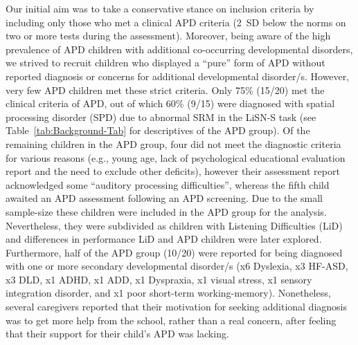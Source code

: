 \documentclass[a4paper, twoside]{templates/ociamthesis}
\begin{document}
Our initial aim was to take a conservative stance on inclusion criteria by including only those who met a clinical APD criteria (2~SD below the norms on two or more tests during the assessment). Moreover, being aware of the high prevalence of APD children with additional co-occurring developmental disorders, we strived to recruit children who displayed a ``pure'' form of APD without reported diagnosis or concerns for additional developmental disorder/s. However, very few APD children met these strict criteria. Only 75\% (15/20) met the clinical criteria of APD, out of which 60\% (9/15) were diagnosed with spatial processing disorder (SPD) due to abnormal SRM in the LiSN-S task (see Table~\ref{tab:Background-Tab} for descriptives of the APD group). Of the remaining children in the APD group, four did not meet the diagnostic criteria for various reasons (e.g., young age, lack of psychological educational evaluation report and the need to exclude other deficits), however their assessment report acknowledged some ``auditory processing difficulties'', whereas the fifth child awaited an APD assessment following an APD screening. Due to the small sample-size these children were included in the APD group for the analysis. Nevertheless, they were subdivided as children with Listening Difficulties (LiD) and differences in performance LiD and APD children were later explored. Furthermore, half of the APD group (10/20) were reported for being diagnosed with one or more secondary developmental disorder/s (x6 Dyslexia, x3 HF-ASD, x3 DLD, x1 ADHD, x1 ADD, x1 Dyspraxia, x1 visual stress, x1 sensory integration disorder, and x1 poor short-term working-memory). Nonetheless, several caregivers reported that their motivation for seeking additional diagnosis was to get more help from the school, rather than a real concern, after feeling that their support for their child's APD was lacking.\\
\end{document}
